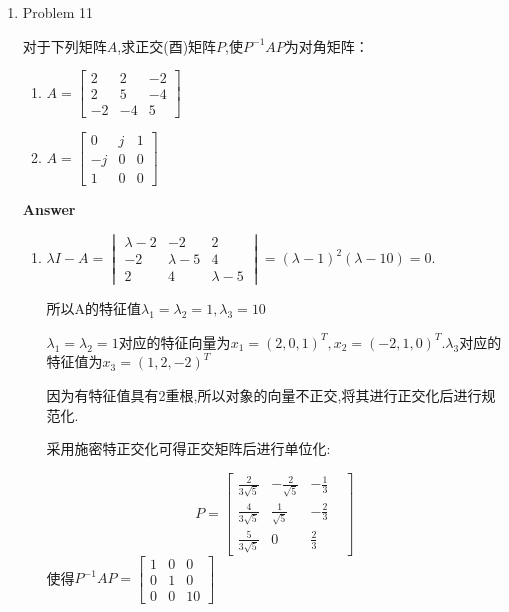 \documentclass[11pt,letterpaper]{ctexart}
\begin{document}
\begin{enumerate}

\item Problem 11%

对于下列矩阵$A$,求正交(酉)矩阵$P$,使$P^{-1}AP$为对角矩阵：
\begin{enumerate}
	\item $A = \begin{bmatrix}
		2 & 2 & -2 \\
		2 & 5 & -4 \\
		-2 & -4 & 5
	\end{bmatrix}$

	\item $A = \begin{bmatrix}
		0 & j & 1 \\
		-j & 0 & 0 \\
		1 & 0 & 0
	\end{bmatrix}$
\end{enumerate}

\bigskip
\textbf{\large{Answer}}
\begin{enumerate}
	\item  $\lambda I - A = \begin{vmatrix}
		\lambda - 2 & -2 & 2 \\
		-2 & \lambda - 5 & 4 \\
		2 & 4 & \lambda - 5
	\end{vmatrix} = (\lambda - 1)^{2}(\lambda - 10) = 0$.
	
	所以A的特征值$\lambda_1 = \lambda_2 = 1, \lambda_3 = 10$ 

	$\lambda_1 = \lambda_2 = 1$对应的特征向量为$x_1 = (2, 0, 1)^T, x_2 = (-2, 1, 0)^T. \lambda_3$对应的特征值为$x_3 = (1, 2, -2)^T$

	因为有特征值具有2重根,所以对象的向量不正交,将其进行正交化后进行规范化.
	
	采用施密特正交化可得正交矩阵后进行单位化:

	$$ P = \begin{bmatrix}
		\frac{2}{3\sqrt{5}} & -\frac{2}{\sqrt{5}} & -\frac{1}{3} & \\
		\frac{4}{3\sqrt{5}} & \frac{1}{\sqrt{5}} & -\frac{2}{3} & \\
		\frac{5}{3\sqrt{5}} & 0 & \frac{2}{3}
	\end{bmatrix}$$使得$P^{-1}AP = \begin{bmatrix}
		1 & 0 & 0 \\
		0 & 1 & 0 \\
		0 & 0 & 10
	\end{bmatrix}$


\end{enumerate}
\end{enumerate}
\end{document}
